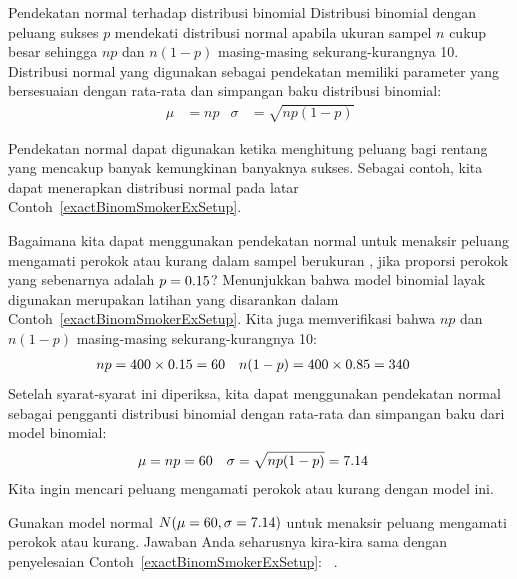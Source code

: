 \begin{onebox}{Pendekatan normal terhadap distribusi binomial}
  Distribusi binomial dengan peluang sukses $p$ mendekati distribusi
  normal apabila ukuran sampel $n$ cukup besar sehingga $np$ dan
  $n(1-p)$ masing-masing sekurang-kurangnya 10. Distribusi normal yang
  digunakan sebagai pendekatan memiliki parameter yang bersesuaian dengan
  rata-rata dan simpangan baku distribusi binomial:\vspace{-1.5mm}
  \begin{align*}
  \mu &= np
      &\sigma& = \sqrt{np(1 - p)}
  \end{align*}
\end{onebox}

Pendekatan normal dapat digunakan ketika menghitung peluang bagi rentang
yang mencakup banyak kemungkinan banyaknya sukses. Sebagai contoh, kita
dapat menerapkan
distribusi normal pada latar Contoh~\ref{exactBinomSmokerExSetup}.

\D{\newpage}

\begin{examplewrap}
\begin{nexample}{Bagaimana kita dapat menggunakan pendekatan normal untuk
    menaksir peluang mengamati \smokex{} perokok atau kurang dalam sampel
    berukuran \smoken{}, jika proporsi perokok yang sebenarnya adalah
    $p=0.15{}$?}
  \label{approxNormalForSmokerBinomEx}
  Menunjukkan bahwa model binomial layak digunakan merupakan latihan yang
  disarankan dalam Contoh~\ref{exactBinomSmokerExSetup}. Kita juga
  memverifikasi bahwa $np$ dan $n(1-p)$ masing-masing sekurang-kurangnya 10:
  \begin{align*}
  np &= 400{} \times 0.15{} = 60{}
  &n (1 - p) &= 400{} \times 0.85{}
      = 340{}
  \end{align*}
  Setelah syarat-syarat ini diperiksa, kita dapat menggunakan pendekatan
  normal sebagai pengganti distribusi binomial dengan rata-rata dan
  simpangan baku dari model binomial:
  \begin{align*}
  \mu &= np = 60{}
  &\sigma &= \sqrt{np(1 - p)} = 7.14{}
  \end{align*}
  Kita ingin mencari peluang mengamati \smokex{} perokok atau kurang
  dengan model ini.
\end{nexample}
\end{examplewrap}

\begin{exercisewrap}
\begin{nexercise}
Gunakan model normal $N(\mu=60{}, \sigma=7.14{})$ untuk
menaksir peluang mengamati \smokex{} perokok atau kurang. Jawaban Anda
seharusnya kira-kira sama dengan penyelesaian
Contoh~\ref{exactBinomSmokerExSetup}:%
~\smokelowertailbinom{}.~\footnotemark{}
\end{nexercise}
\end{exercisewrap}



